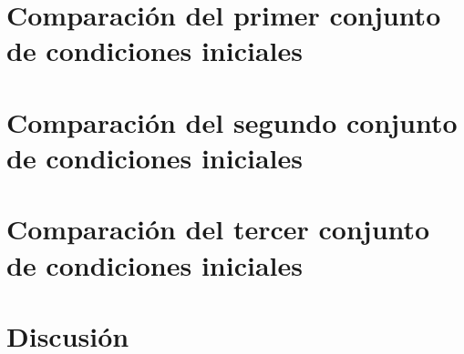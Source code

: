 \section{Comparación del primer conjunto de condiciones iniciales}
\section{Comparación del segundo conjunto de condiciones iniciales}
\section{Comparación del tercer conjunto de condiciones iniciales}

\section{Discusión}
%
